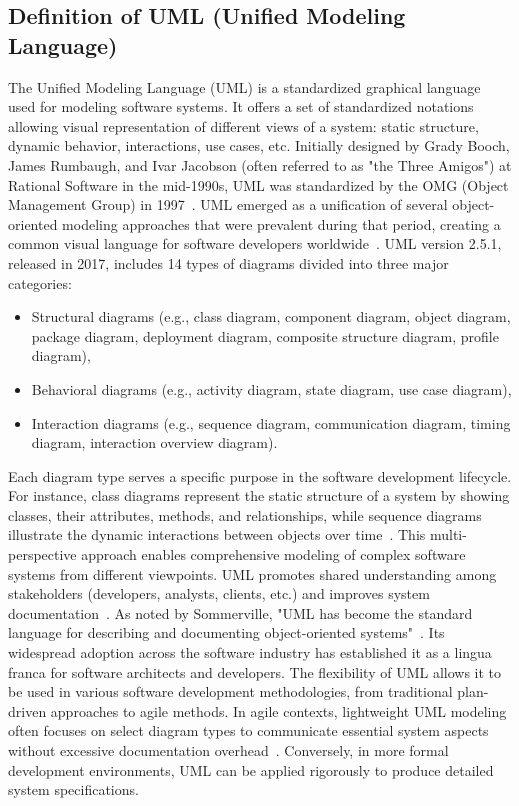 \documentclass[12pt,a4paper]{report}
\begin{document}
\subsection{Definition of UML (Unified Modeling Language)}
The Unified Modeling Language (UML) is a standardized graphical language used for modeling software systems. It offers a set of standardized notations allowing visual representation of different views of a system: static structure, dynamic behavior, interactions, use cases, etc.
Initially designed by Grady Booch, James Rumbaugh, and Ivar Jacobson (often referred to as "the Three Amigos") at Rational Software in the mid-1990s, UML was standardized by the OMG (Object Management Group) in 1997~\cite{omg2017}. UML emerged as a unification of several object-oriented modeling approaches that were prevalent during that period, creating a common visual language for software developers worldwide~\cite{pressman2014}.
UML version 2.5.1, released in 2017, includes 14 types of diagrams divided into three major categories:
\begin{itemize}
\item Structural diagrams (e.g., class diagram, component diagram, object diagram, package diagram, deployment diagram, composite structure diagram, profile diagram),
\item Behavioral diagrams (e.g., activity diagram, state diagram, use case diagram),
\item Interaction diagrams (e.g., sequence diagram, communication diagram, timing diagram, interaction overview diagram).
\end{itemize}
Each diagram type serves a specific purpose in the software development lifecycle. For instance, class diagrams represent the static structure of a system by showing classes, their attributes, methods, and relationships, while sequence diagrams illustrate the dynamic interactions between objects over time~\cite{sommerville2015}. This multi-perspective approach enables comprehensive modeling of complex software systems from different viewpoints.
UML promotes shared understanding among stakeholders (developers, analysts, clients, etc.) and improves system documentation~\cite{omg2017}. As noted by Sommerville, "UML has become the standard language for describing and documenting object-oriented systems"~\cite{sommerville2015}. Its widespread adoption across the software industry has established it as a lingua franca for software architects and developers.
The flexibility of UML allows it to be used in various software development methodologies, from traditional plan-driven approaches to agile methods. In agile contexts, lightweight UML modeling often focuses on select diagram types to communicate essential system aspects without excessive documentation overhead~\cite{pressman2014}. Conversely, in more formal development environments, UML can be applied rigorously to produce detailed system specifications.
\end{document}
